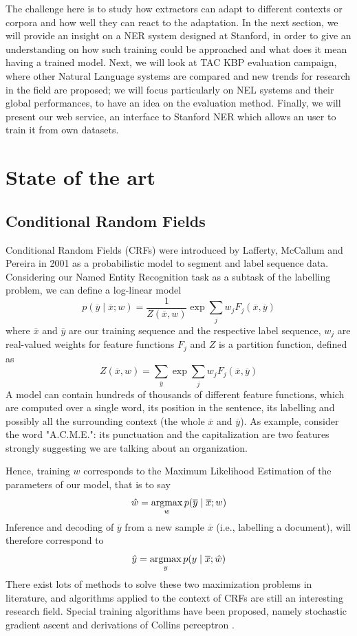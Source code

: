 \documentclass[a4paper,11pt]{report}
\newcommand{\argmax}{\operatornamewithlimits{argmax}}
\begin{document}
The challenge here is to study how extractors can adapt to different contexts or corpora and how well they can react to the adaptation. In the next section, we will provide an insight on a NER system designed at Stanford, in order to give an understanding on how such training could be approached and what does it mean having a trained model. Next, we will look at TAC KBP evaluation campaign, where other Natural Language systems are compared and new trends for research in the field are proposed; we will focus particularly on NEL systems and their global performances, to have an idea on the evaluation method. Finally, we will present our web service, an interface to Stanford NER which allows an user to train it from own datasets.

\chapter{State of the art}

\section{Conditional Random Fields}
\label{sec:crfs}
Conditional Random Fields (CRFs) were introduced by Lafferty, McCallum and Pereira in 2001\cite{lafferty2001conditional} as a probabilistic model to segment and label sequence data. Considering our Named Entity Recognition task as a subtask of the labelling problem, we can define a log-linear model
$$
p(\overline{y} \mid \overline{x}; w) = \frac{1}{Z(\overline{x}, w)}\exp\sum\limits_j w_jF_j(\overline{x}, \overline{y})
$$
where $\overline{x}$ and $\overline{y}$ are our training sequence and the respective label sequence, $w_j$ are real-valued weights for feature functions $F_j$ and $Z$ is a partition function, defined as
$$
Z(\overline{x}, w) = \sum\limits_{\overline{y}}\exp\sum\limits_j w_jF_j(\overline{x}, \overline{y})
$$
A model can contain hundreds of thousands of different feature functions, which are computed over a single word, its position in the sentence, its labelling and possibly all the surrounding context (the whole $\overline{x}$ and $\overline{y}$). As example, consider the word "A.C.M.E.": its punctuation and the capitalization are two features strongly suggesting we are talking about an organization.

Hence, training $w$ corresponds to the Maximum Likelihood Estimation of the parameters of our model, that is to say
$$
\hat{w} = \argmax_w p(\overline{y} \mid \overline{x}; w)
$$
Inference and decoding of $\overline{y}$ from a new sample $\overline{x}$ (i.e., labelling a document), will therefore correspond to
$$
\hat{y} = \argmax_y p(y \mid \overline{x}; \hat{w})
$$
There exist lots of methods to solve these two maximization problems in literature, and algorithms applied to the context of CRFs are still an interesting research field. Special training algorithms have been proposed, namely stochastic gradient ascent and derivations of Collins perceptron \cite{elkan2008log}.
\end{document}
